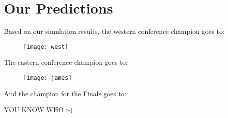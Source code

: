 \section{Our Predictions}

Based on our simulation results, the western conference champion goes to:
\newpage

\begin{figure}[h]
\centering
\texttt{[image: west]}
\end{figure}

\newpage

The eastern conference champion goes to:

\newpage

\begin{figure}[h]
\centering
\texttt{[image: james]}
\end{figure}

\newpage

And the champion for the Finals goes to: 

\newpage


YOU KNOW WHO :-)


